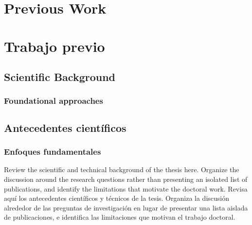 %

{
  \chapter{Previous Work}
}
{
  \chapter{Trabajo previo}
}
\label{cha:compendium-previous-work}

{
  \section{Scientific Background}
  \subsection{Foundational approaches}
}
{
  \section{Antecedentes científicos}
  \subsection{Enfoques fundamentales}
}

{
  Review the scientific and technical background of the thesis here. Organize the discussion around the research questions rather than presenting an isolated list of publications, and identify the limitations that motivate the doctoral work.
}
{
  Revisa aquí los antecedentes científicos y técnicos de la tesis. Organiza la discusión alrededor de las preguntas de investigación en lugar de presentar una lista aislada de publicaciones, e identifica las limitaciones que motivan el trabajo doctoral.
}

